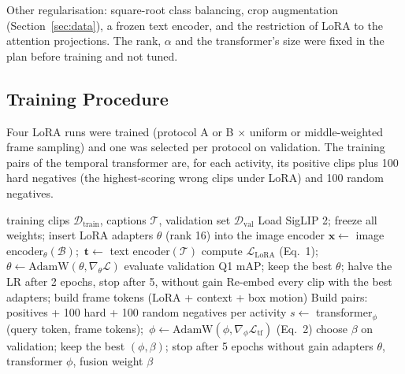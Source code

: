 \documentclass[11pt,a4paper]{article}
\begin{document}
Other regularisation: square-root class balancing, crop augmentation (Section~\ref{sec:data}), a frozen text encoder,
and the restriction of LoRA to the attention projections. The rank, $\alpha$ and the transformer's size were fixed in
the plan before training and not tuned.

\subsection{Training Procedure}
Four LoRA runs were trained (protocol A or B $\times$ uniform or middle-weighted frame sampling) and one was
selected per protocol on validation. The training pairs of the temporal transformer are, for each activity, its
positive clips plus 100 hard negatives (the highest-scoring wrong clips under LoRA) and 100 random negatives.

\begin{algorithm}[H]
\caption{Training procedure (LoRA retriever, then temporal transformer)}\label{alg:train}
\begin{algorithmic}[1]
\Require training clips $\mathcal{D}_{\mathrm{train}}$, captions $\mathcal{T}$, validation set $\mathcal{D}_{\mathrm{val}}$
\State Load SigLIP 2; freeze all weights; insert LoRA adapters $\theta$ (rank 16) into the image encoder
    \State $\mathbf{x} \gets$ image encoder$_\theta(\mathcal{B})$;\ $\mathbf{t} \gets$ text encoder$(\mathcal{T})$
    \State compute $\mathcal{L}_{\mathrm{LoRA}}$ (Eq.~1);\ $\theta \gets \mathrm{AdamW}(\theta, \nabla_\theta \mathcal{L})$
  \EndFor
  \State evaluate validation Q1 mAP; keep the best $\theta$; halve the LR after 2 epochs, stop after 5, without gain
\EndFor
\State Re-embed every clip with the best adapters; build frame tokens (LoRA + context + box motion)
\State Build pairs: positives + 100 hard + 100 random negatives per activity
    \State $s \gets$ transformer$_\phi$(query token, frame tokens);\ $\phi \gets \mathrm{AdamW}(\phi, \nabla_\phi \mathcal{L}_{\mathrm{tf}})$ (Eq.~2)
  \EndFor
  \State choose $\beta$ on validation; keep the best $(\phi,\beta)$; stop after 5 epochs without gain
\EndFor
\State \Return adapters $\theta$, transformer $\phi$, fusion weight $\beta$
\end{algorithmic}
\end{algorithm}

\end{document}
